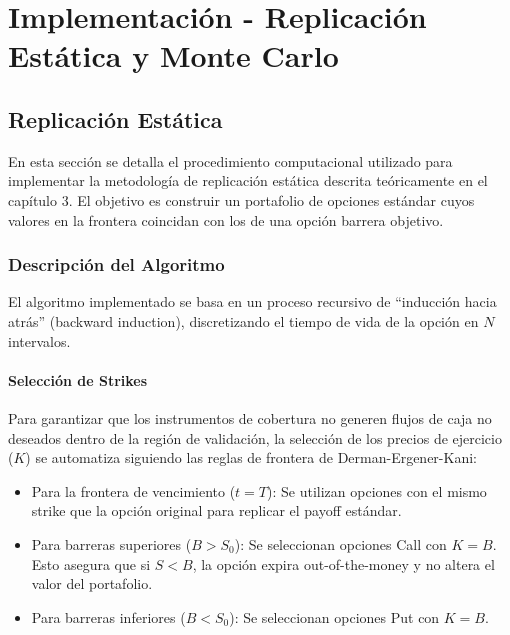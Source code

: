 \chapter{Implementación - Replicación Estática y Monte Carlo}
\label{chapter:impl_replicacion_mc}


\section{Replicación Estática}
\label{sec:impl_replicacion}

En esta sección se detalla el procedimiento computacional utilizado para implementar la metodología de replicación estática descrita teóricamente en el capítulo 3. El objetivo es construir un portafolio de opciones estándar cuyos valores en la frontera coincidan con los de una opción barrera objetivo.

\subsection{Descripción del Algoritmo}

El algoritmo implementado se basa en un proceso recursivo de ``inducción hacia atrás'' (backward induction), discretizando el tiempo de vida de la opción en $N$ intervalos.

\subsubsection*{Selección de Strikes} 

Para garantizar que los instrumentos de cobertura no generen flujos de caja no deseados dentro de la región de validación, la selección de los precios de ejercicio ($K$) se automatiza siguiendo las reglas de frontera de Derman-Ergener-Kani:

\begin{itemize} 
  \item Para la frontera de vencimiento ($t=T$): Se utilizan opciones con el mismo strike que la opción original para replicar el payoff estándar.
  
  \item Para barreras superiores ($B>S_0$): Se seleccionan opciones Call con $K=B$. Esto asegura que si $S<B$, la opción expira out-of-the-money y no altera el valor del portafolio.
  
  \item Para barreras inferiores ($B<S_0$): Se seleccionan opciones Put con $K=B$. 
\end{itemize}

